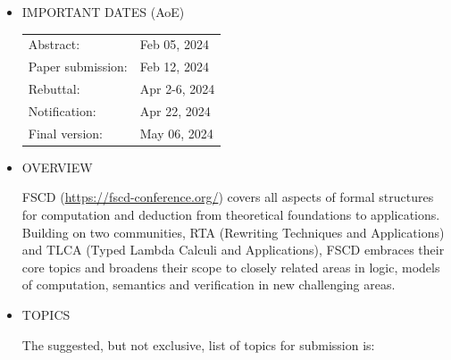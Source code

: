 \documentclass[prodmode,acmtecs]{acmsmall} %
\begin{document}
\begin{itemize}\item  IMPORTANT DATES (AoE)  
 
\begin{tabulary}{\linewidth}{LL}Abstract:  & Feb 05, 2024 \\
Paper submission:  & Feb 12, 2024 \\
Rebuttal:  & Apr 2-6, 2024 \\
Notification:  & Apr 22, 2024 \\
Final version:  & May 06, 2024 \\
\end{tabulary}
 
\item  OVERVIEW 
 
  FSCD (\href{https://fscd-conference.org/}{https://fscd-conference.org/}) covers all aspects of formal structures for computation and deduction from theoretical foundations to applications. Building on two communities, RTA (Rewriting Techniques and Applications) and TLCA (Typed Lambda Calculi and Applications), FSCD embraces their core topics and broadens their scope to closely related areas in logic, models of computation, semantics and verification in new challenging areas. 
 
\item  TOPICS 
 
  The suggested, but not exclusive, list of topics for submission is: 
 

\end{itemize}
\end{document}
